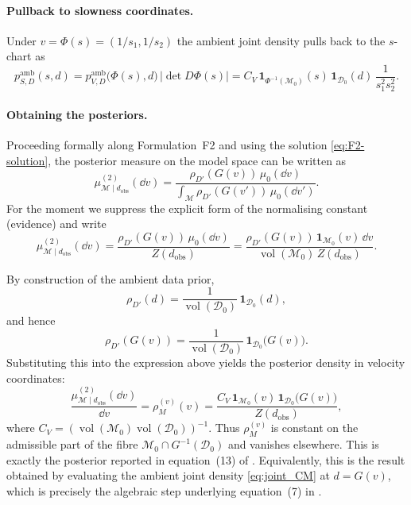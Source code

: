 \documentclass[11pt]{article}
\theoremstyle{remark}
\newcommand{\modelspace}{\mathcal{M}}
\newcommand{\dataspace}{\mathcal{D}}
\begin{document}
\paragraph{Pullback to slowness coordinates.}
Under \(v=\Phi(s)=(1/s_1,1/s_2)\) the ambient joint density pulls back to
the \(s\)-chart as
\begin{equation}\label{eq:joint_CM_slowness}
p_{S,D}^{\mathrm{amb}}(s,d)
= p_{V,D}^{\mathrm{amb}}\bigl(\Phi(s),d\bigr)\,\bigl|\det D\Phi(s)\bigr|
= C_V\,\mathbf{1}_{\Phi^{-1}(\modelspace_0)}(s)\,\mathbf{1}_{\dataspace_0}(d)\,\frac{1}{s_1^2 s_2^2}.
\end{equation}

\paragraph{Obtaining the posteriors.}
Proceeding formally along Formulation~F2 and using the solution
\eqref{eq:F2-solution}, the posterior measure on the model space can be written
as
\begin{equation}
\label{eq:F2-posterior-general}
\mu^{(2)}_{\modelspace\mid d_{\mathrm{obs}}}(\dd v)
=
\frac{\rho_{D'}(G(v))\,\mu_0(\dd v)}
{\int_{\modelspace}\rho_{D'}(G(v'))\,\mu_0(\dd v')}.
\end{equation}
For the moment we suppress the explicit form of the normalising constant
(evidence) and write
\begin{equation}
\mu^{(2)}_{\modelspace\mid d_{\mathrm{obs}}}(\dd v)
=
\frac{\rho_{D'}(G(v))\,\mu_0(\dd v)}{Z(d_{\mathrm{obs}})}
=
\frac{\rho_{D'}(G(v))\,\mathbf{1}_{\modelspace_0}(v)\,\dd v}
{\operatorname{vol}(\modelspace_0)\,Z(d_{\mathrm{obs}})} .
\end{equation}

By construction of the ambient data prior,
\[
\rho_{D'}(d)
=
\frac{1}{\operatorname{vol}(\dataspace_0)}\,\mathbf{1}_{\dataspace_0}(d),
\]
and hence
\[
\rho_{D'}(G(v))
=
\frac{1}{\operatorname{vol}(\dataspace_0)}\,
\mathbf{1}_{\dataspace_0}\!\bigl(G(v)\bigr).
\]
Substituting this into the expression above yields the posterior density in
velocity coordinates:
\begin{equation}
\label{eq:velocity_posterior}
\frac{\mu^{(2)}_{\modelspace\mid d_{\mathrm{obs}}}(\dd v)}{\dd v}
=
\rho_M^{(v)}(v)
=
\frac{C_V\,
\mathbf{1}_{\modelspace_0}(v)\,
\mathbf{1}_{\dataspace_0}\!\bigl(G(v)\bigr)}
{Z(d_{\mathrm{obs}})} ,
\end{equation}
where \(C_V=(\operatorname{vol}(\modelspace_0)\operatorname{vol}(\dataspace_0))^{-1}\).
Thus \(\rho_M^{(v)}\) is constant on the admissible part of the fibre
\(\modelspace_0\cap G^{-1}(\dataspace_0)\) and vanishes elsewhere. This is
exactly the posterior reported in equation~(13) of
\citet{MosegaardCurtis2024}. Equivalently, this is the result obtained by
evaluating the ambient joint density \eqref{eq:joint_CM} at \(d=G(v)\), which is
precisely the algebraic step underlying equation~(7) in
\citet{MosegaardCurtis2024}.
\end{document}
